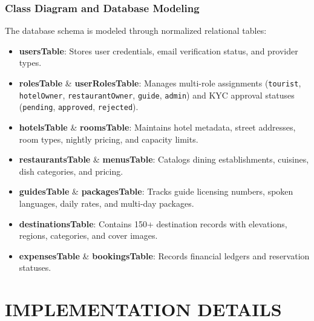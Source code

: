 \documentclass[12pt,a4paper]{report}
\begin{document}
\subsection{Class Diagram and Database Modeling}
The database schema is modeled through normalized relational tables:
\begin{itemize}
    \item \textbf{usersTable}: Stores user credentials, email verification status, and provider types.
    \item \textbf{rolesTable} \& \textbf{userRolesTable}: Manages multi-role assignments (\texttt{tourist}, \texttt{hotelOwner}, \texttt{restaurantOwner}, \texttt{guide}, \texttt{admin}) and KYC approval statuses (\texttt{pending}, \texttt{approved}, \texttt{rejected}).
    \item \textbf{hotelsTable} \& \textbf{roomsTable}: Maintains hotel metadata, street addresses, room types, nightly pricing, and capacity limits.
    \item \textbf{restaurantsTable} \& \textbf{menusTable}: Catalogs dining establishments, cuisines, dish categories, and pricing.
    \item \textbf{guidesTable} \& \textbf{packagesTable}: Tracks guide licensing numbers, spoken languages, daily rates, and multi-day packages.
    \item \textbf{destinationsTable}: Contains 150+ destination records with elevations, regions, categories, and cover images.
    \item \textbf{expensesTable} \& \textbf{bookingsTable}: Records financial ledgers and reservation statuses.
\end{itemize}

\chapter{IMPLEMENTATION DETAILS}
\end{document}
